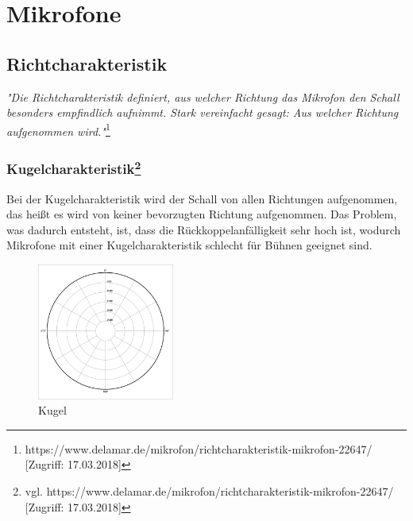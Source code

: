 \section{Mikrofone}
\subsection{Richtcharakteristik}
\textit{"Die Richtcharakteristik definiert, aus welcher Richtung das Mikrofon den Schall besonders empfindlich aufnimmt. Stark vereinfacht gesagt: Aus welcher Richtung aufgenommen wird."}\footnote{\label{}https://www.delamar.de/mikrofon/richtcharakteristik-mikrofon-22647/ [Zugriff: 17.03.2018]} 
\subsubsection[Kugelcharakteristik]{Kugelcharakteristik\protect\footnote{\label{}vgl. https://www.delamar.de/mikrofon/richtcharakteristik-mikrofon-22647/ [Zugriff: 17.03.2018]}}
Bei der Kugelcharakteristik wird der Schall von allen Richtungen aufgenommen, das heißt es wird von keiner bevorzugten Richtung aufgenommen. Das Problem, was dadurch entsteht, ist, dass die Rückkoppelanfälligkeit sehr hoch ist, wodurch Mikrofone mit einer Kugelcharakteristik schlecht für Bühnen geeignet sind. 
\begin{figure}[H]
	\centering
	\includegraphics[width=0.4\textwidth]{abb4} 
	\caption{Kugel}
\end{figure}
